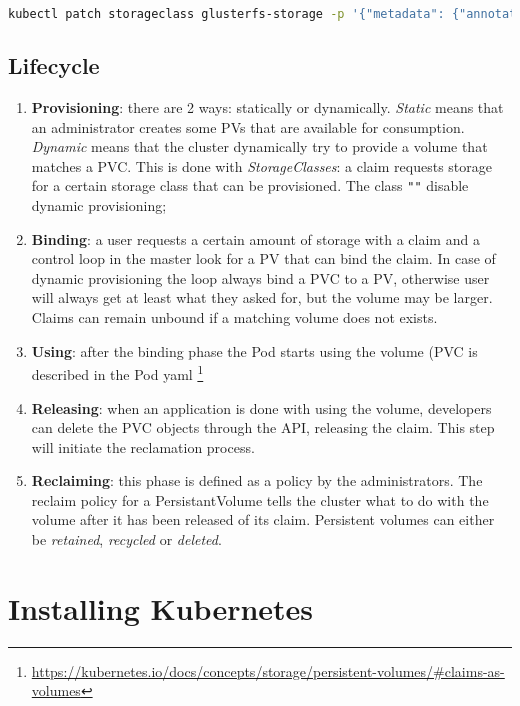 \begin{lstlisting}[language=bash]
kubectl patch storageclass glusterfs-storage -p '{"metadata": {"annotations":{"storageclass.kubernetes.io/is-default-class":"true"}}}'
\end{lstlisting}

\subsection{Lifecycle}\label{lifecycle}

\begin{enumerate}
\item \textbf{Provisioning}: there are 2 ways: statically or dynamically.
  \emph{Static} means that an administrator creates some PVs that are
  available for consumption. \emph{Dynamic} means that the cluster
  dynamically try to provide a volume that matches a PVC. This is done
  with \emph{StorageClasses}: a claim requests storage for a certain
  storage class that can be provisioned. The class \texttt{""} disable
  dynamic provisioning;
\item \textbf{Binding}: a user requests a certain amount of storage with a
  claim and a control loop in the master look for a PV that can bind the
  claim. In case of dynamic provisioning the loop always bind a PVC to a
  PV, otherwise user will always get at least what they asked for, but
  the volume may be larger. Claims can remain unbound if a matching
  volume does not exists.
\item \textbf{Using}: after the binding phase the Pod starts using the volume
  (PVC is described in the Pod yaml
  \footnote{\url{https://kubernetes.io/docs/concepts/storage/persistent-volumes/\#claims-as-volumes}}
\item \textbf{Releasing}: when an application is done with using the volume,
  developers can delete the PVC objects through the API, releasing the
  claim. This step will initiate the reclamation process.
\item \textbf{Reclaiming}: this phase is defined as a policy by the
  administrators. The reclaim policy for a PersistantVolume tells the
  cluster what to do with the volume after it has been released of its
  claim. Persistent volumes can either be \emph{retained},
  \emph{recycled} or \emph{deleted}.
\end{enumerate}

\section{Installing Kubernetes}\label{installing-kubernetes}

